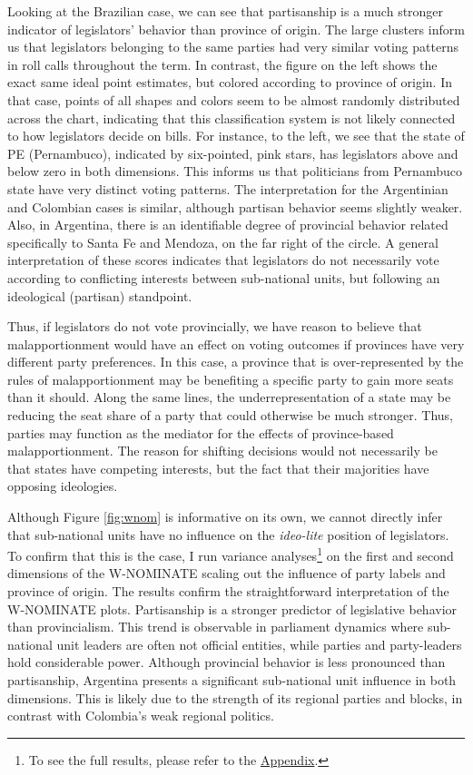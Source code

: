 \documentclass[a4paper,12pt]{article}
\begin{document}
Looking at the Brazilian case, we can see that partisanship is a much stronger indicator of legislators' behavior than province of origin. The large clusters inform us that legislators belonging to the same parties had very similar voting patterns in roll calls throughout the term. In contrast, the figure on the left shows the exact same ideal point estimates, but colored according to province of origin. In that case, points of all shapes and colors seem to be almost randomly distributed across the chart, indicating that this classification system is not likely connected to how legislators decide on bills. For instance, to the left, we see that the state of PE (Pernambuco), indicated by six-pointed, pink stars, has legislators above and below zero in both dimensions. This informs us that politicians from Pernambuco state have very distinct voting patterns. The interpretation for the Argentinian and Colombian cases is similar, although partisan behavior seems slightly weaker. Also, in Argentina, there is an identifiable degree of provincial behavior related specifically to Santa Fe and Mendoza, on the far right of the circle. A general interpretation of these scores indicates that legislators do not necessarily vote according to conflicting interests between sub-national units, but following an ideological (partisan) standpoint.

Thus, if legislators do not vote provincially, we have reason to believe that malapportionment would have an effect on voting outcomes if provinces have very different party preferences. In this case, a province that is over-represented by the rules of malapportionment may be benefiting a specific party to gain more seats than it should. Along the same lines, the underrepresentation of a state may be reducing the seat share of a party that could otherwise be much stronger. Thus, parties may function as the mediator for the effects of province-based malapportionment. The reason for shifting decisions would not necessarily be that states have competing interests, but the fact that their majorities have opposing ideologies.

Although Figure \ref{fig:wnom} is informative on its own, we cannot directly infer that sub-national units have no influence on the \textit{ideo-lite} position of legislators. To confirm that this is the case, I run variance analyses\footnote{To see the full results, please refer to the \hyperlink{https://github.com/catarinaroman/malapportionment-lat-am/appendix.pdf}{Appendix}.} on the first and second dimensions of the W-NOMINATE scaling out the influence of party labels and province of origin. The results confirm the straightforward interpretation of the W-NOMINATE plots. Partisanship is a stronger predictor of legislative behavior than provincialism. This trend is observable in parliament dynamics where sub-national unit leaders are often not official entities, while parties and party-leaders hold considerable power. Although provincial behavior is less pronounced than partisanship, Argentina presents a significant sub-national unit influence in both dimensions. This is likely due to the strength of its regional parties and blocks, in contrast with Colombia's weak regional politics.
\end{document}
